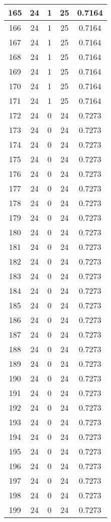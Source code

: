 \documentclass[letterpaper, 12pt]{article}
\begin{document}
\begin{longtable}{|c|c|c|c|c|}
\hline
165 & 24 & 1 & 25 & 0.7164 \\
\hline
166 & 24 & 1 & 25 & 0.7164 \\
\hline
167 & 24 & 1 & 25 & 0.7164 \\
\hline
168 & 24 & 1 & 25 & 0.7164 \\
\hline
169 & 24 & 1 & 25 & 0.7164 \\
\hline
170 & 24 & 1 & 25 & 0.7164 \\
\hline
171 & 24 & 1 & 25 & 0.7164 \\
\hline
172 & 24 & 0 & 24 & 0.7273 \\
\hline
173 & 24 & 0 & 24 & 0.7273 \\
\hline
174 & 24 & 0 & 24 & 0.7273 \\
\hline
175 & 24 & 0 & 24 & 0.7273 \\
\hline
176 & 24 & 0 & 24 & 0.7273 \\
\hline
177 & 24 & 0 & 24 & 0.7273 \\
\hline
178 & 24 & 0 & 24 & 0.7273 \\
\hline
179 & 24 & 0 & 24 & 0.7273 \\
\hline
180 & 24 & 0 & 24 & 0.7273 \\
\hline
181 & 24 & 0 & 24 & 0.7273 \\
\hline
182 & 24 & 0 & 24 & 0.7273 \\
\hline
183 & 24 & 0 & 24 & 0.7273 \\
\hline
184 & 24 & 0 & 24 & 0.7273 \\
\hline
185 & 24 & 0 & 24 & 0.7273 \\
\hline
186 & 24 & 0 & 24 & 0.7273 \\
\hline
187 & 24 & 0 & 24 & 0.7273 \\
\hline
188 & 24 & 0 & 24 & 0.7273 \\
\hline
189 & 24 & 0 & 24 & 0.7273 \\
\hline
190 & 24 & 0 & 24 & 0.7273 \\
\hline
191 & 24 & 0 & 24 & 0.7273 \\
\hline
192 & 24 & 0 & 24 & 0.7273 \\
\hline
193 & 24 & 0 & 24 & 0.7273 \\
\hline
194 & 24 & 0 & 24 & 0.7273 \\
\hline
195 & 24 & 0 & 24 & 0.7273 \\
\hline
196 & 24 & 0 & 24 & 0.7273 \\
\hline
197 & 24 & 0 & 24 & 0.7273 \\
\hline
198 & 24 & 0 & 24 & 0.7273 \\
\hline
199 & 24 & 0 & 24 & 0.7273 \\
\hline
\end{longtable}
\end{document}

